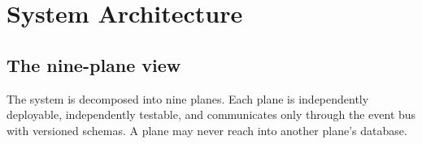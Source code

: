 \chapter{System Architecture}
\label{ch:arch}

\section{The nine-plane view}

The system is decomposed into nine planes. Each plane is independently
deployable, independently testable, and communicates only through the event bus
with versioned schemas. A plane may never reach into another plane's database.

